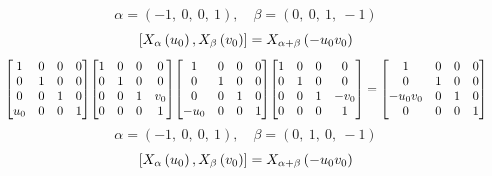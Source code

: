 \documentclass[11pt]{article}
\theoremstyle{definition}
\begin{document}
\providecommand{\scaletoalign}[2]{%
  \sbox0{$#2$}%
  \ifdim\wd0>#1\relax 
    \resizebox{#1}{!}{\usebox0}%
  \else 
    \usebox0%
  \fi 
}
\[
\alpha = \left( -1, \  0, \  0, \  1\right), \quad \beta = \left( 0, \  0, \  1, \  -1\right)
\]
\[
\scaletoalign{\textwidth}{\left[ X_{\alpha}\left(u_{0}\right), X_{\beta}\left(v_{0}\right) \right] = X_{\alpha + \beta}\left(- u_{0} v_{0}\right)}
\]
\[
\scaletoalign{\textwidth}{{\left[\begin{matrix}1 & 0 & 0 & 0\\0 & 1 & 0 & 0\\0 & 0 & 1 & 0\\u_{0} & 0 & 0 & 1\end{matrix}\right]} {\left[\begin{matrix}1 & 0 & 0 & 0\\0 & 1 & 0 & 0\\0 & 0 & 1 & v_{0}\\0 & 0 & 0 & 1\end{matrix}\right]} {\left[\begin{matrix}1 & 0 & 0 & 0\\0 & 1 & 0 & 0\\0 & 0 & 1 & 0\\- u_{0} & 0 & 0 & 1\end{matrix}\right]} {\left[\begin{matrix}1 & 0 & 0 & 0\\0 & 1 & 0 & 0\\0 & 0 & 1 & - v_{0}\\0 & 0 & 0 & 1\end{matrix}\right]} = {\left[\begin{matrix}1 & 0 & 0 & 0\\0 & 1 & 0 & 0\\- u_{0} v_{0} & 0 & 1 & 0\\0 & 0 & 0 & 1\end{matrix}\right]}}
\]
\[
\alpha = \left( -1, \  0, \  0, \  1\right), \quad \beta = \left( 0, \  1, \  0, \  -1\right)
\]
\[
\scaletoalign{\textwidth}{\left[ X_{\alpha}\left(u_{0}\right), X_{\beta}\left(v_{0}\right) \right] = X_{\alpha + \beta}\left(- u_{0} v_{0}\right)}
\]
\end{document}
